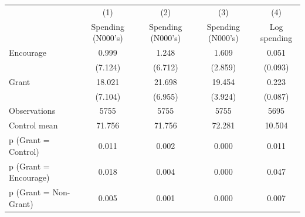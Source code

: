 \begin{tabular*}{\hsize}{@{\hskip\tabcolsep\extracolsep\fill}l*{4}{c}}
\toprule
                    &\multicolumn{1}{c}{(1)}&\multicolumn{1}{c}{(2)}&\multicolumn{1}{c}{(3)}&\multicolumn{1}{c}{(4)}\\
                    &\multicolumn{1}{c}{Spending (N000's)}&\multicolumn{1}{c}{Spending (N000's)}&\multicolumn{1}{c}{Spending (N000's)}&\multicolumn{1}{c}{Log spending}\\
\midrule
Encourage           &       0.999&       1.248&       1.609&       0.051\\
                    &     (7.124)&     (6.712)&     (2.859)&     (0.093)\\
\addlinespace
Grant               &      18.021&      21.698&      19.454&       0.223\\
                    &     (7.104)&     (6.955)&     (3.924)&     (0.087)\\
\midrule
Observations        &        5755&        5755&        5755&        5695\\
Control mean        &      71.756&      71.756&      72.281&      10.504\\
p (Grant = Control) &       0.011&       0.002&       0.000&       0.011\\
p (Grant = Encourage)&       0.018&       0.004&       0.000&       0.047\\
p (Grant = Non-Grant)&       0.005&       0.001&       0.000&       0.007\\
\bottomrule
\end{tabular*}
